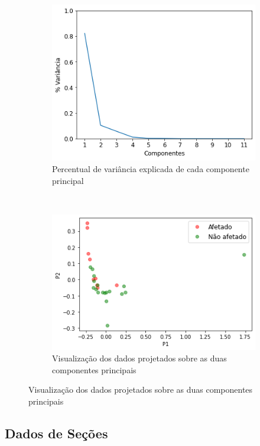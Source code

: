 \begin{figure}[htb] 
    \centering 
    \caption{PCA sobre dados totais de UFs}
    \label{fig:resultados:base-de-dados-25-pca-2d-total-uf} 
    \begin{subfigure}[b]{0.45\textwidth}
        \includegraphics[scale=0.45]{images/base-de-dados-25.1-pca-components-total-uf.png}
        \caption{Percentual de variância explicada de cada componente principal}
        \label{fig:resultados:base-de-dados-25.1-pca-components-total-uf}
    \end{subfigure} ~ \quad
    \begin{subfigure}[b]{0.45\textwidth}
        \includegraphics[scale=0.45]{images/base-de-dados-25.2-pca-2d-total-uf.png}
        \caption{Visualização dos dados projetados sobre as duas componentes principais}
        \label{fig:resultados:base-de-dados-25.2-pca-2d-total-uf}
    \end{subfigure}
    \fdadospesquisa
\end{figure}

\subsection{Dados de Seções}
\label{section:deteccao-impacto:secao}

